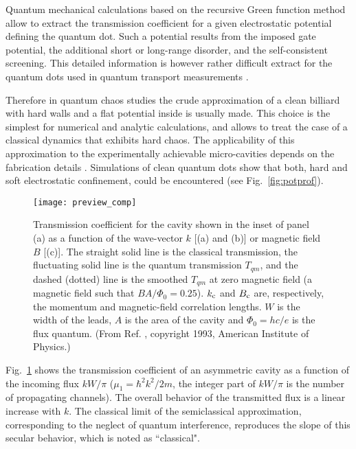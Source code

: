 \documentclass[a4paper,10pt]{article}
\newcommand{\nin}{\noindent}
\begin{document}
\nin Quantum mechanical calculations based on the recursive Green function method \cite{LeeFish} allow to extract the transmission coefficient for a given electrostatic potential defining the quantum dot. Such a potential results from the imposed gate potential, the additional short or long-range disorder, and the self-consistent screening. This detailed information is however rather difficult extract for the quantum dots used in quantum transport measurements \cite{Nixon90,Stopa}. 

\nin Therefore in quantum chaos studies the crude approximation of a clean billiard with hard walls and a flat potential inside is usually made. This choice is the simplest for numerical and analytic calculations, and allows to treat the case of a classical dynamics that exhibits hard chaos. The applicability of this approximation to the experimentally achievable micro-cavities depends on the fabrication details \cite{Chaos,Taylor97,Sachrajda98}. Simulations of clean quantum dots show that both, hard and soft electrostatic confinement, could be encountered (see Fig.~\ref{fig:potprof}).

\begin{figure}
\setlength{\unitlength}{1mm}
\centerline{\texttt{[image: preview\_comp]}}
\caption{
Transmission coefficient for the cavity shown in the inset of panel (a) as a function of the wave-vector $k$ [(a) and (b)] or magnetic field $B$ [(c)]. The straight solid line is the classical transmission, the fluctuating solid line is the quantum transmission $T_{qm}$, and the dashed (dotted) line is the smoothed $T_{qm}$ at zero magnetic field (a magnetic field  such that $BA/ \Phi_{0}\!=\!0.25$). $k_{\rm c}$ and $B_{\rm c}$ are, respectively, the momentum and magnetic-field correlation lengths. $W$ is the width of the leads, $A$ is the area of the cavity and $\Phi_{0}=hc/e$ is the flux quantum. (From Ref. \protect\cite{Chaost}, copyright 1993, American Institute of Physics.)
}
\label{fig:preview}
\end{figure}


\nin Fig.~\ref{fig:preview} shows the transmission coefficient
of an asymmetric cavity as a function of the incoming flux
$kW/\pi$ ($\mu_1=\hbar^2 k^2/2m$, the integer part of $kW/\pi$
is the number of propagating channels). The overall behavior
of the transmitted flux is a linear increase with $k$. The classical limit of the semiclassical approximation, corresponding to the neglect of
quantum interference, reproduces the slope of this secular
behavior, which is noted as ``classical". 
\end{document}
